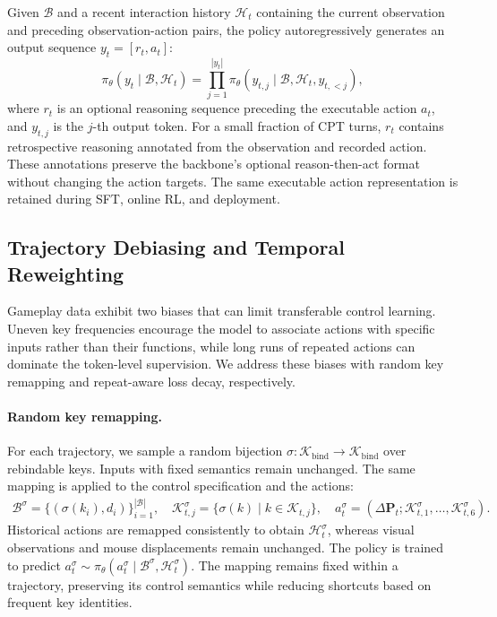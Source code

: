Given $\mathcal{B}$ and a recent interaction history $\mathcal{H}_t$ containing the current observation and preceding observation-action pairs, the policy autoregressively generates an output sequence $y_t=[r_t, a_t]$:
\begin{equation}
\pi_\theta(y_t\mid\mathcal{B},\mathcal{H}_t)
=\prod_{j=1}^{|y_t|}
\pi_\theta(y_{t,j}\mid\mathcal{B},\mathcal{H}_t,y_{t,<j}),
\label{eq:autoregressive_policy}
\end{equation}
where $r_t$ is an optional reasoning sequence preceding the executable action $a_t$, and  $y_{t,j}$ is the $j$-th output token. For a small fraction of CPT turns, $r_t$ contains retrospective reasoning annotated from the observation and recorded action. These annotations preserve the backbone's optional reason-then-act format without changing the action targets. The same executable action representation is retained during SFT, online RL, and deployment.

\subsection{Trajectory Debiasing and Temporal Reweighting}
\label{sec:trajectory_debiasing}

Gameplay data exhibit two biases that can limit transferable control learning. Uneven key frequencies encourage the model to associate actions with specific inputs rather than their functions, while long runs of repeated actions can dominate the token-level supervision. We address these biases with random key remapping and repeat-aware loss decay, respectively.

\paragraph{Random key remapping.}
For each trajectory, we sample a random bijection $\sigma:\mathcal{K}_{\mathrm{bind}}\rightarrow\mathcal{K}_{\mathrm{bind}}$ over rebindable keys. Inputs with fixed semantics remain unchanged. The same mapping is applied to the control specification and the actions:
\begin{equation}
\begin{aligned}
\mathcal{B}^\sigma
  =\{(\sigma(k_i),d_i)\}_{i=1}^{|\mathcal{B}|},\quad
\mathcal{K}_{t,j}^\sigma
=\{\sigma(k)\mid k\in\mathcal{K}_{t,j}\},\quad
a_t^\sigma
    =\left(\Delta\mathbf{P}_t; \mathcal{K}_{t,1}^\sigma,\ldots,\mathcal{K}_{t,6}^\sigma\right).
\end{aligned}
\end{equation}
Historical actions are remapped consistently to obtain $\mathcal{H}_t^\sigma$, whereas visual observations and mouse displacements remain unchanged. The policy is trained to predict $a_t^\sigma \sim \pi_\theta(a_t^\sigma\mid\mathcal{B}^\sigma,\mathcal{H}_t^\sigma)$. The mapping remains fixed within a trajectory, preserving its control semantics while reducing shortcuts based on frequent key identities.

